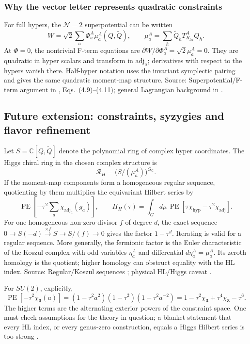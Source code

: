 \documentclass[11pt,a4paper]{article}
\numberwithin{equation}{section}
\newcommand{\PE}{\operatorname{PE}}
\newcommand{\adj}{\mathrm{adj}}
\newcommand{\CC}{\mathbb C}
\newcommand{\src}[1]{{\small\color{muted}Source: #1.}\par}
\begin{document}
\subsubsection{Why the vector letter represents quadratic constraints}
For full hypers, the $\mathcal N=2$ superpotential can be written
\begin{equation}
 W=\sqrt2\sum_a\Phi_a^A\mu_a^A(Q,\widetilde Q),\qquad
 \mu_a^A=\sum_h\widetilde Q_hT^A_{R_{ha}}Q_h.
 \label{eq:moment}
\end{equation}
At $\Phi=0$, the nontrivial F-term equations are
$\partial W/\partial\Phi_a^A=\sqrt2\mu_a^A=0$. They are quadratic in hyper
scalars and transform in $\adj_a$; derivatives with respect to the hypers
vanish there. Half-hyper notation uses the invariant symplectic pairing and
gives the same quadratic moment-map structure.
\src{Superpotential/F-term argument in \cite{grry}, Eqs.~(4.9)--(4.11);
general Lagrangian background in \cite{tachikawa}}

\clearpage
\subsection{Future extension: constraints, syzygies and flavor refinement}
Let $S=\CC[Q,\widetilde Q]$ denote the polynomial ring of complex hyper
coordinates. The Higgs chiral ring in the chosen complex structure is
\begin{equation}
 \mathcal R_H=\bigl(S/(\mu_a^A)\bigr)^{G_\CC}.
 \label{eq:higgs-ring}
\end{equation}
If the moment-map components form a homogeneous regular sequence, quotienting
by them multiplies the equivariant Hilbert series by
\begin{equation}
 \PE\!\left[-\tau^2\sum_a\chi_{\adj_a}(g_a)\right],\qquad
 H_H(\tau)=\int_Gd\mu\,\PE\!\left[\tau\chi_{\mathrm{hyp}}
 -\tau^2\chi_{\adj}\right].
 \label{eq:higgs-pe}
\end{equation}
For one homogeneous non-zero-divisor $f$ of degree $d$, the exact sequence
$0\to S(-d)\xrightarrow{\times f}S\to S/(f)\to0$ gives the factor $1-\tau^d$.
Iterating is valid for a regular sequence. More generally, the fermionic
factor is the Euler characteristic of the Koszul complex with odd variables
$\eta_a^A$ and differential $d\eta_a^A=\mu_a^A$. Its zeroth homology is the
quotient; higher homology can obstruct equality with the HL index.
\src{Regular/Koszul sequences \cite{stacks}; physical HL/Higgs caveat \cite{hl-caveat}}
For $SU(2)$, explicitly,
\begin{equation}
 \PE[-\tau^2\chi_{\mathbf3}(a)]
 =(1-\tau^2a^2)(1-\tau^2)(1-\tau^2a^{-2})
 =1-\tau^2\chi_{\mathbf3}+\tau^4\chi_{\mathbf3}-\tau^6.
 \label{eq:su2-koszul}
\end{equation}
The higher terms are the alternating exterior powers of the constraint space.
One must check assumptions for the theory in question; a blanket statement that
every HL index, or every genus-zero construction, equals a Higgs Hilbert series
is too strong \cite{hl-caveat}.
\end{document}

